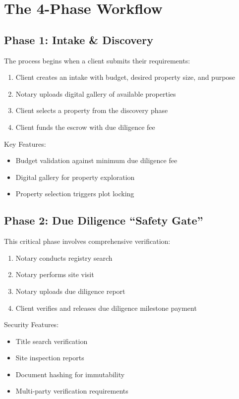 \documentclass[12pt,a4paper]{article}
\begin{document}
\section{The 4-Phase Workflow}

\subsection{Phase 1: Intake \& Discovery}
The process begins when a client submits their requirements:
\begin{enumerate}
\item Client creates an intake with budget, desired property size, and purpose
\item Notary uploads digital gallery of available properties
\item Client selects a property from the discovery phase
\item Client funds the escrow with due diligence fee
\end{enumerate}

Key Features:
\begin{itemize}
\item Budget validation against minimum due diligence fee
\item Digital gallery for property exploration
\item Property selection triggers plot locking
\end{itemize}

\subsection{Phase 2: Due Diligence ``Safety Gate''}
This critical phase involves comprehensive verification:

\begin{enumerate}
\item Notary conducts registry search
\item Notary performs site visit
\item Notary uploads due diligence report
\item Client verifies and releases due diligence milestone payment
\end{enumerate}

Security Features:
\begin{itemize}
\item Title search verification
\item Site inspection reports
\item Document hashing for immutability
\item Multi-party verification requirements
\end{itemize}
\end{document}

